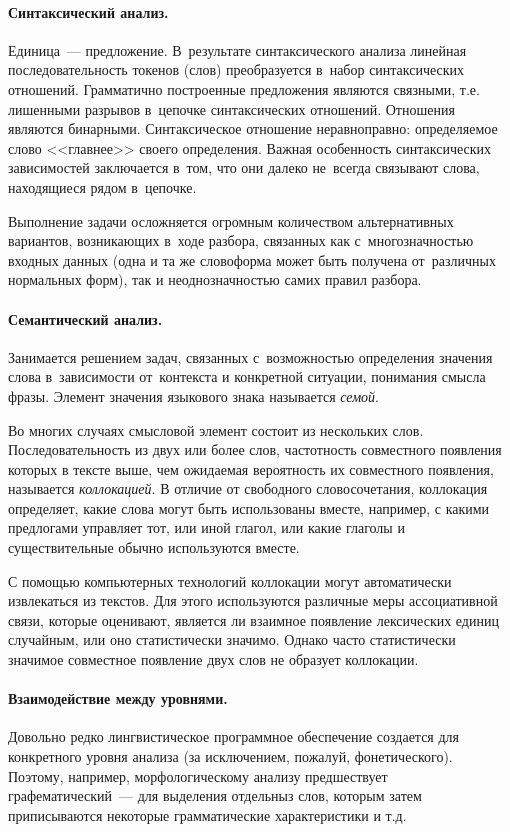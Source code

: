 \documentclass[12pt]{article}
\theoremstyle{definition}
\theoremstyle{remark}
\numberwithin{equation}{section}
\begin{document}
\paragraph{Синтаксический анализ.} Единица~--- предложение.
В~результате синтаксического анализа линейная последовательность
токенов (слов) преобразуется в~набор синтаксических отношений.
Грамматично построенные предложения являются связными, т.е.
лишенными разрывов в~цепочке синтаксических отношений. Отношения
являются бинарными. Синтаксическое отношение неравноправно:
определяемое слово <<главнее>> своего определения. Важная
особенность синтаксических зависимостей заключается в~том,
что они далеко не~всегда связывают слова, находящиеся рядом
в~цепочке.

Выполнение задачи осложняется огромным количеством альтернативных
вариантов, возникающих в~ходе разбора, связанных как
с~многозначностью входных данных (одна и та же словоформа может
быть получена от~различных нормальных форм), так и неоднозначностью
самих правил разбора.

\paragraph{Семантический анализ.} Занимается решением задач,
связанных с~возможностью определения значения слова в~зависимости
от~контекста и конкретной ситуации, понимания смысла фразы.
Элемент значения языкового знака называется {\sl семой}.

Во многих случаях смысловой элемент состоит из нескольких слов.
Последовательность из двух или более слов, частотность совместного
появления которых в тексте выше, чем ожидаемая вероятность их
совместного появления, называется {\sl коллокацией}. В отличие
от свободного словосочетания, коллокация определяет, какие слова
могут быть использованы вместе, например, с какими предлогами
управляет тот, или иной глагол, или какие глаголы и существительные
обычно используются вместе.

С помощью компьютерных технологий коллокации могут автоматически
извлекаться из текстов. Для этого используются различные меры
ассоциативной связи, которые оценивают, является ли взаимное появление
лексических единиц случайным, или оно статистически значимо. Однако
часто статистически значимое совместное появление двух слов не образует
коллокации.

\paragraph{Взаимодействие между уровнями.} Довольно редко лингвистическое программное обеспечение создается для конкретного уровня анализа (за исключением, пожалуй, фонетического). Поэтому, например, морфологическому анализу предшествует графематический~--- для выделения отдельныз слов, которым затем приписываются некоторые грамматические характеристики и т.д.
\end{document}
